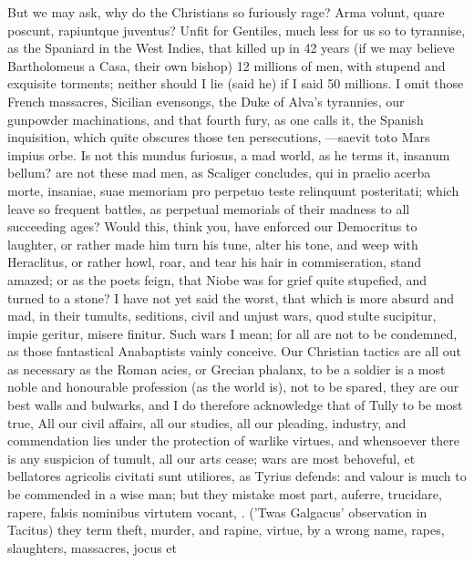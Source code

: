 {But we may ask, why do the Christians so furiously rage? Arma
volunt, quare poscunt, rapiuntque juventus? Unfit for Gentiles, much
less for us so to tyrannise, as the Spaniard in the West Indies, that
killed up in 42 years (if we may believe Bartholomeus a Casa,
their own bishop) 12 millions of men, with stupend and exquisite
torments; neither should I lie (said he) if I said 50 millions. I omit
those French massacres, Sicilian evensongs, the Duke of Alva's
tyrannies, our gunpowder machinations, and that fourth fury, as
one calls it, the Spanish inquisition, which quite obscures those
ten persecutions, ---saevit toto Mars impius orbe. Is not this
mundus furiosus, a mad world, as he terms it, insanum bellum? are
not these mad men, as Scaliger concludes, qui in praelio acerba
morte, insaniae, suae memoriam pro perpetuo teste relinquunt
posteritati; which leave so frequent battles, as perpetual memorials of
their madness to all succeeding ages? Would this, think you, have
enforced our Democritus to laughter, or rather made him turn his tune,
alter his tone, and weep with Heraclitus, or rather howl,
roar, and tear his hair in commiseration, stand amazed; or as the
poets feign, that Niobe was for grief quite stupefied, and turned to a
stone? I have not yet said the worst, that which is more absurd and
mad, in their tumults, seditions, civil and unjust wars, quod
stulte sucipitur, impie geritur, misere finitur. Such wars I mean; for
all are not to be condemned, as those fantastical Anabaptists vainly
conceive. Our Christian tactics are all out as necessary as the Roman
acies, or Grecian phalanx, to be a soldier is a most noble and
honourable profession (as the world is), not to be spared, they are our
best walls and bulwarks, and I do therefore acknowledge that of
Tully to be most true, All our civil affairs, all our studies, all
our pleading, industry, and commendation lies under the protection of
warlike virtues, and whensoever there is any suspicion of tumult, all
our arts cease; wars are most behoveful, et bellatores agricolis
civitati sunt utiliores, as Tyrius defends: and valour is much to
be commended in a wise man; but they mistake most part, auferre,
trucidare, rapere, falsis nominibus virtutem vocant, \etc{}. ('Twas
Galgacus' observation in Tacitus) they term theft, murder, and rapine,
virtue, by a wrong name, rapes, slaughters, massacres, \etc{} jocus et
}
